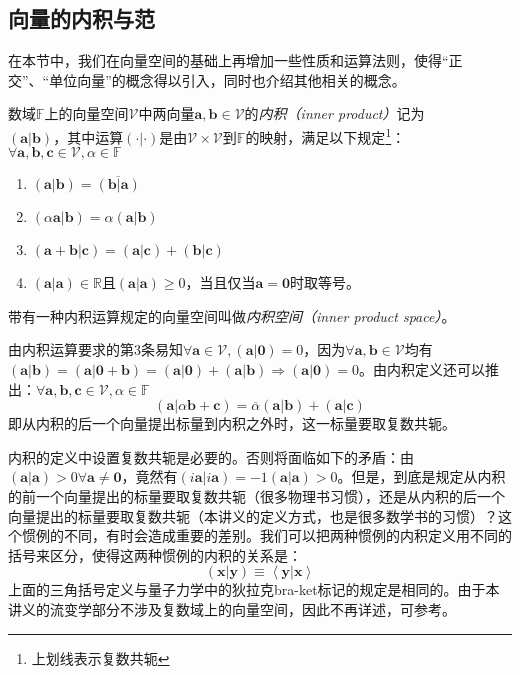 \documentclass[../main.tex]{subfiles}
\begin{document}
\subsection{向量的内积与范}
在本节中，我们在向量空间的基础上再增加一些性质和运算法则，使得“正交”、“单位向量”的概念得以引入，同时也介绍其他相关的概念。

\begin{definition}[内积]\label{def:II.2.8}
    数域$\mathbb{F}$上的向量空间$\mathcal{V}$中两向量$\mathbf{a},\mathbf{b}\in\mathcal{V}$的\emph{内积（inner product）}记为$\left(\mathbf{a}|\mathbf{b}\right)，其中运算\left(\cdot|\cdot\right)是由\mathcal{V}\times\mathcal{V}$到$\mathbb{F}$的映射，满足以下规定\footnote{上划线表示复数共轭}：$\forall\mathbf{a},\mathbf{b},\mathbf{c}\in\mathcal{V},\alpha\in\mathbb{F}$
    \begin{enumerate}
        \item $\left(\mathbf{a}|\mathbf{b}\right)=\overline{\left(\mathbf{b}|\mathbf{a}\right)}$
        \item $\left(\alpha\mathbf{a}|\mathbf{b}\right)=\alpha\left(\mathbf{a}|\mathbf{b}\right)$
        \item $\left(\mathbf{a}+\mathbf{b}|\mathbf{c}\right)=\left(\mathbf{a}|\mathbf{c}\right)+\left(\mathbf{b}|\mathbf{c}\right)$
        \item $\left(\mathbf{a}|\mathbf{a}\right)\in\mathbb{R}$且$\left(\mathbf{a}|\mathbf{a}\right)\geq0$，当且仅当$\mathbf{a}=\mathbf{0}$时取等号。
    \end{enumerate}
    带有一种内积运算规定的向量空间叫做\emph{内积空间（inner product space）}。
\end{definition}

由内积运算要求的第3条易知$\forall\mathbf{a}\in\mathcal{V},\left(\mathbf{a}|\mathbf{0}\right)=0$，因为$\forall\mathbf{a},\mathbf{b}\in\mathcal{V}$均有$\left(\mathbf{a}|\mathbf{b}\right)=\left(\mathbf{a}|\mathbf{0}+\mathbf{b}\right)=\left(\mathbf{a}|\mathbf{0}\right)+\left(\mathbf{a}|\mathbf{b}\right)\Rightarrow\left(\mathbf{a}|\mathbf{0}\right)=0$。由内积定义还可以推出：$\forall\mathbf{a},\mathbf{b},\mathbf{c}\in\mathcal{V},\alpha\in\mathbb{F}$
\[\left(\mathbf{a}|\alpha\mathbf{b}+\mathbf{c}\right)=\overline{\alpha}\left(\mathbf{a}|\mathbf{b}\right)+\left(\mathbf{a}|\mathbf{c}\right)\]
即从内积的后一个向量提出标量到内积之外时，这一标量要取复数共轭。

内积的定义中设置复数共轭是必要的。否则将面临如下的矛盾：由$\left(\mathbf{a}|\mathbf{a}\right)>0\forall\mathbf{a}\neq\mathbf{0}$，竟然有$\left(i\mathbf{a}|i\mathbf{a}\right)=-1\left(\mathbf{a}|\mathbf{a}\right)>0$。但是，到底是规定从内积的前一个向量提出的标量要取复数共轭（很多物理书习惯），还是从内积的后一个向量提出的标量要取复数共轭（本讲义的定义方式，也是很多数学书的习惯）？这个惯例的不同，有时会造成重要的差别。我们可以把两种惯例的内积定义用不同的括号来区分，使得这两种惯例的内积的关系是：
\[\left(\mathbf{x}|\mathbf{y}\right)\equiv\left\langle\mathbf{y}|\mathbf{x}\right\rangle\]
上面的三角括号定义与量子力学中的狄拉克bra-ket标记的规定是相同的。由于本讲义的流变学部分不涉及复数域上的向量空间，因此不再详述，可参考\cite[\S1.3.1]{Hassani1999}。
\end{document}
